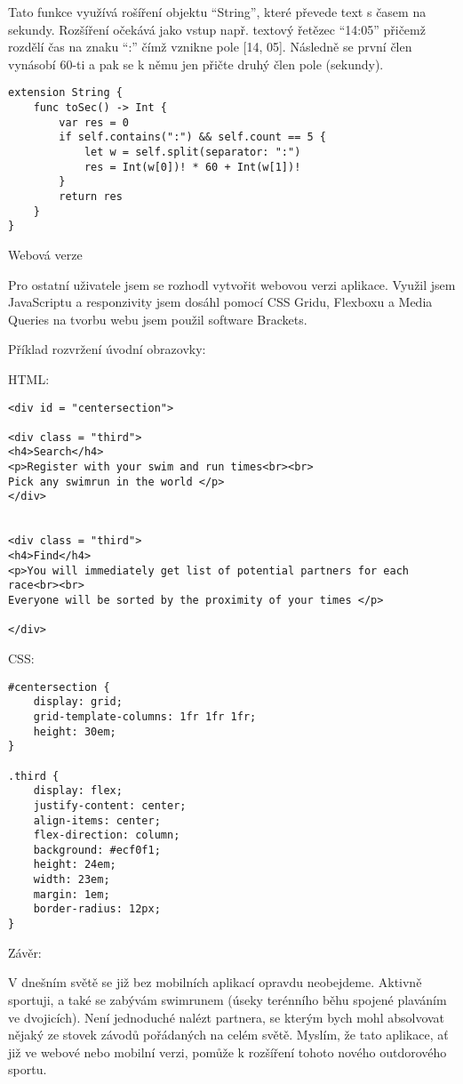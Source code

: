 \documentclass{article}
\begin{document}
\vspace{10 mm}
Tato funkce využívá rošíření objektu “String”, které převede text s časem na sekundy. Rozšíření očekává jako vstup např. textový řetězec “14:05” přičemž rozdělí čas na znaku “:” čímž vznikne pole [14, 05]. Následně se první člen vynásobí 60-ti a pak se k němu jen přičte druhý člen pole (sekundy).

\vspace{10 mm}

\begin{verbatim}
extension String {
    func toSec() -> Int {
        var res = 0
        if self.contains(":") && self.count == 5 {
            let w = self.split(separator: ":")
            res = Int(w[0])! * 60 + Int(w[1])!
        }
        return res
    }
}

\end{verbatim}



\vspace{10 mm}
Webová verze

Pro ostatní uživatele jsem se rozhodl vytvořit webovou verzi aplikace. Využil jsem JavaScriptu a responzivity jsem dosáhl pomocí CSS Gridu, Flexboxu a Media Queries na tvorbu webu jsem použil software Brackets. 

Příklad rozvržení úvodní obrazovky:


HTML:
\begin{verbatim}
<div id = "centersection">
    
<div class = "third">
<h4>Search</h4>
<p>Register with your swim and run times<br><br>
Pick any swimrun in the world </p>
</div>
    

<div class = "third">
<h4>Find</h4>
<p>You will immediately get list of potential partners for each race<br><br>
Everyone will be sorted by the proximity of your times </p>    

</div>
\end{verbatim}

\vspace{10 mm}
CSS: 

\begin{verbatim}
#centersection {
	display: grid;
	grid-template-columns: 1fr 1fr 1fr;
	height: 30em;
}

.third {
	display: flex;
	justify-content: center;
	align-items: center;
	flex-direction: column;
	background: #ecf0f1;
	height: 24em;
	width: 23em;
	margin: 1em;
	border-radius: 12px;
}
\end{verbatim}


\vspace{10 mm}
Závěr:

V dnešním světě se již bez mobilních aplikací opravdu neobejdeme. Aktivně sportuji, a také se zabývám swimrunem (úseky terénního běhu spojené plaváním ve dvojicích). Není jednoduché nalézt partnera, se kterým bych mohl absolvovat nějaký ze stovek závodů pořádaných na celém světě. Myslím, že tato aplikace, ať již ve webové nebo mobilní verzi, pomůže k rozšíření tohoto nového outdorového sportu.
\end{document}
